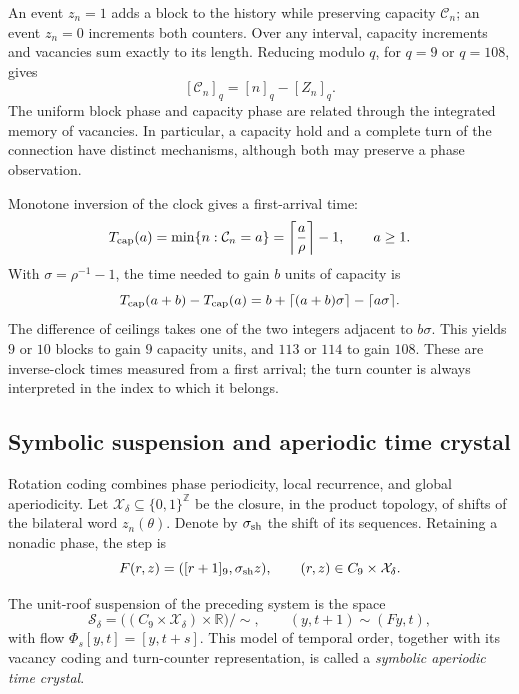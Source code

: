 An event \(z_n=1\) adds a block to the history while preserving capacity
\(\mathcal C_n\); an event \(z_n=0\) increments both counters. Over
any interval, capacity increments and vacancies sum
exactly to its length. Reducing modulo \(q\), for \(q=9\) or
\(q=108\), gives
\[
 [\mathcal C_n]_q=[n]_q-[Z_n]_q.
\]
The uniform block phase and capacity phase are related through
the integrated memory of vacancies. In particular, a capacity
hold and a complete turn of the connection have distinct
mechanisms, although both may preserve a phase observation.

Monotone inversion of the clock gives a first-arrival time:
\[
 T_{\rm cap}(a)=\min\{n:\mathcal C_n=a\}
 =\left\lceil\frac a\rho\right\rceil-1,
 \qquad a\geq1.
\]
With \(\sigma=\rho^{-1}-1\), the time needed to gain \(b\) units
of capacity is
\[
 T_{\rm cap}(a+b)-T_{\rm cap}(a)
 =b+\lceil(a+b)\sigma\rceil-\lceil a\sigma\rceil.
\]
The difference of ceilings takes one of the two integers adjacent to
\(b\sigma\). This yields \(9\) or \(10\) blocks to gain
\(9\) capacity units, and \(113\) or \(114\) to gain \(108\).
These are inverse-clock times measured from a first arrival; the
turn counter is always interpreted in the index to which it belongs.

\subsection{Symbolic suspension and aperiodic time crystal}
\label{mono-ampl:cristal}

Rotation coding combines phase periodicity, local recurrence,
and global aperiodicity. Let \(\mathcal X_\delta\subseteq\{0,1\}^{\mathbb Z}\)
be the closure, in the product topology, of shifts of the bilateral
word \(z_n(\theta)\). Denote by \(\sigma_{\rm sh}\) the
shift of its sequences. Retaining a nonadic phase, the step is
\[
 F(r,z)=([r+1]_9,\sigma_{\rm sh}z),\qquad
 (r,z)\in C_9\times\mathcal X_\delta.
\]

\begin{definition}
\label{mono-ampl:def-cristal}
The unit-roof suspension of the preceding system is the space
\[
 \mathcal S_\delta=
 \bigl((C_9\times\mathcal X_\delta)\times\mathbb R\bigr)/\sim,
 \qquad (y,t+1)\sim(Fy,t),
\]
with flow \(\Phi_s[y,t]=[y,t+s]\). This model of temporal order,
together with its vacancy coding and turn-counter representation,
is called a \emph{symbolic aperiodic time crystal}.
\end{definition}

